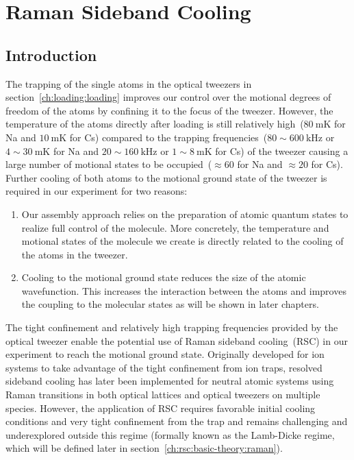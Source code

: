 
\chapter{Raman Sideband Cooling}
\label{ch:rsc}

\section{Introduction}
\label{ch:rsc:introduction}

The trapping of the single atoms in the optical tweezers in section~\ref{ch:loading:loading}
improves our control over the motional degrees of freedom of the atoms
by confining it to the focus of the tweezer.
However, the temperature of the atoms directly after loading
is still relatively high~($80~\mathrm{mK}$ for Na and
$10~\mathrm{mK}$ for Cs)
compared to the trapping frequencies~($80\sim600~\mathrm{kHz}$ or $4\sim30~\mathrm{mK}$ for Na
and $20\sim160~\mathrm{kHz}$ or $1\sim8~\mathrm{mK}$ for Cs)
of the tweezer causing a large number of motional states
to be occupied~($\approx\!60$ for Na and $\approx\!20$ for Cs).
Further cooling of both atoms to the motional ground state of the tweezer
is required in our experiment for two reasons:
\begin{enumerate}
\item Our assembly approach relies on the preparation of atomic quantum states
  to realize full control of the molecule.
  More concretely, the temperature and motional states of the molecule we create
  is directly related to the cooling of the atoms in the tweezer.
\item Cooling to the motional ground state reduces the size of the atomic wavefunction.
  This increases the interaction between the atoms and
  improves the coupling to the molecular states as will be shown in later chapters.
\end{enumerate}

The tight confinement and relatively high trapping frequencies provided by the optical tweezer
enable the potential use of Raman sideband cooling~(RSC)
in our experiment to reach the motional ground state.
Originally developed for ion systems to take advantage of the tight confinement from ion traps,
resolved sideband cooling has later been implemented for neutral atomic systems
using Raman transitions in both optical lattices and optical tweezers
on multiple species.
However, the application of RSC requires favorable initial cooling conditions
and very tight confinement from the trap and remains challenging and underexplored
outside this regime (formally known as the Lamb-Dicke regime,
which will be defined later in section~\ref{ch:rsc:basic-theory:raman}).

